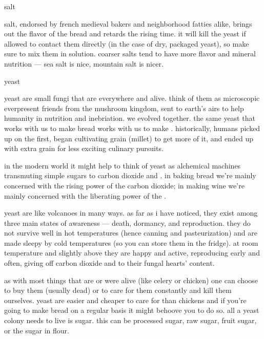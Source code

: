 \begin{ingredients}\item salt\end{ingredients}

salt, endorsed by french medieval bakers and neighborhood fatties
alike, brings out the flavor of the bread and retards the rising
time. it will kill the yeast if allowed to contact them directly (in
the case of dry, packaged yeast), so make sure to mix them in
solution. coarser salts tend to have more flavor and mineral nutrition
--- sea salt is nice, mountain salt is nicer.

\begin{ingredients}\item yeast\end{ingredients}

yeast are small fungi that are everywhere and alive. think of them as
microscopic everpresent friends from the mushroom kingdom, sent to
earth's airs to help humanity in nutrition and inebriation. we
evolved together. the same yeast that works with us to make bread
works with us to make . historically, humans picked up on the
 first, began cultivating grain (millet) to get more of it, and
ended up with extra grain for less exciting culinary pursuits.

in the modern world it might help to think of yeast as alchemical
machines transmuting simple sugars to carbon dioxide and . in
baking bread we're mainly concerned with the rising power of the
carbon dioxide; in making wine we're mainly concerned with the
liberating power of the .

yeast are like volcanoes in many ways. as far as i have noticed, they
exist among three main states of awareness --- death, dormancy, and
reproduction. they do not survive well in hot temperatures (hence
canning and pasteurization) and are made sleepy by cold temperatures
(so you can store them in the fridge). at room temperature and
slightly above they are happy and active, reproducing early and often,
giving off carbon dioxide and  to their fungal hearts'
content.

as with most things that are or were alive (like celery or chicken)
one can choose to buy them (usually dead) or to care for them
constantly and kill them ourselves. yeast are easier and cheaper to
care for than chickens and if you're going to make bread on a
regular basis it might behoove you to do so. all a yeast colony needs
to live is sugar. this can be processed sugar, raw sugar, fruit sugar,
or the sugar in flour.

